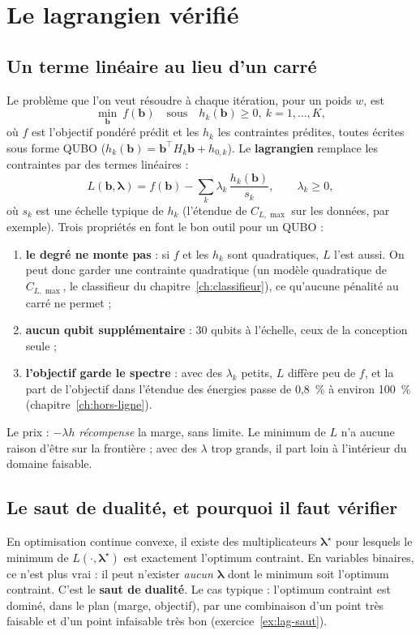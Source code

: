 \chapter{Le lagrangien vérifié}\label{ch:lagrangien}

\section{Un terme linéaire au lieu d'un carré}
Le problème que l'on veut résoudre à chaque itération, pour un poids $w$, est
\[ \min_{\mathbf b}\ f(\mathbf b)\quad\text{sous}\quad h_k(\mathbf b)\ge0,\ k=1,\dots,K, \]
où $f$ est l'objectif pondéré prédit et les $h_k$ les contraintes prédites, toutes écrites sous forme QUBO ($h_k(\mathbf b)=\mathbf b^\top H_k\mathbf b+h_{0,k}$). Le \textbf{lagrangien} remplace les contraintes par des termes linéaires :
\[ L(\mathbf b,\boldsymbol\lambda)=f(\mathbf b)-\sum_k\lambda_k\,\frac{h_k(\mathbf b)}{s_k},\qquad\lambda_k\ge0, \]
où $s_k$ est une échelle typique de $h_k$ (l'étendue de $C_{L,\max}$ sur les données, par exemple). Trois propriétés en font le bon outil pour un QUBO :
\begin{enumerate}
\item \textbf{le degré ne monte pas} : si $f$ et les $h_k$ sont quadratiques, $L$ l'est aussi. On peut donc garder une contrainte quadratique (un modèle quadratique de $C_{L,\max}$, le classifieur du chapitre~\ref{ch:classifieur}), ce qu'aucune pénalité au carré ne permet ;
\item \textbf{aucun qubit supplémentaire} : 30 qubits à l'échelle, ceux de la conception seule ;
\item \textbf{l'objectif garde le spectre} : avec des $\lambda_k$ petits, $L$ diffère peu de $f$, et la part de l'objectif dans l'étendue des énergies passe de 0,8~\% à environ 100~\% (chapitre~\ref{ch:hors-ligne}).
\end{enumerate}
Le prix : $-\lambda h$ \emph{récompense} la marge, sans limite. Le minimum de $L$ n'a aucune raison d'être sur la frontière ; avec des $\lambda$ trop grands, il part loin à l'intérieur du domaine faisable.

\section{Le saut de dualité, et pourquoi il faut vérifier}
En optimisation continue convexe, il existe des multiplicateurs $\boldsymbol\lambda^\star$ pour lesquels le minimum de $L(\cdot,\boldsymbol\lambda^\star)$ est exactement l'optimum contraint. En variables binaires, ce n'est plus vrai : il peut n'exister \emph{aucun} $\boldsymbol\lambda$ dont le minimum soit l'optimum contraint. C'est le \textbf{saut de dualité}. Le cas typique : l'optimum contraint est dominé, dans le plan (marge, objectif), par une combinaison d'un point très faisable et d'un point infaisable très bon (exercice~\ref{ex:lag-saut}).

